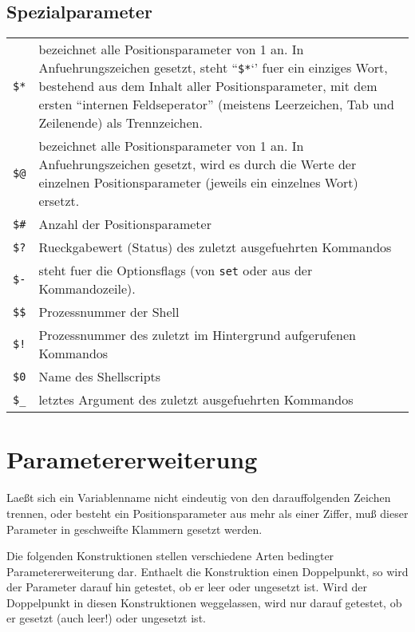 \documentclass[12pt,]{article}
\providecommand{\tightlist}{%
  \setlength{\itemsep}{0pt}\setlength{\parskip}{0pt}}
\begin{document}
\subsection{Spezialparameter}\label{spezialparameter}

\begin{longtable}[c]{@{}ll@{}}
\toprule
\texttt{\$*} & bezeichnet alle Positionsparameter von 1 an. In
Anfuehrungszeichen gesetzt, steht ``\texttt{\$*}`' fuer ein einziges
Wort, bestehend aus dem Inhalt aller Positionsparameter, mit dem ersten
``internen Feldseperator'' (meistens Leerzeichen, Tab und Zeilenende)
als Trennzeichen.\tabularnewline
\texttt{\$@} & bezeichnet alle Positionsparameter von 1 an. In
Anfuehrungszeichen gesetzt, wird es durch die Werte der einzelnen
Positionsparameter (jeweils ein einzelnes Wort) ersetzt.\tabularnewline
\texttt{\$\#} & Anzahl der Positionsparameter\tabularnewline
\texttt{\$?} & Rueckgabewert (Status) des zuletzt ausgefuehrten
Kommandos\tabularnewline
\texttt{\$-} & steht fuer die Optionsflags (von \texttt{set} oder aus
der Kommandozeile).\tabularnewline
\texttt{\$\$} & Prozessnummer der Shell\tabularnewline
\texttt{\$!} & Prozessnummer des zuletzt im Hintergrund aufgerufenen
Kommandos\tabularnewline
\texttt{\$0} & Name des Shellscripts\tabularnewline
\texttt{\$\_} & letztes Argument des zuletzt ausgefuehrten
Kommandos\tabularnewline
\bottomrule
\end{longtable}

\section{Parametererweiterung}\label{parametererweiterung}

\begin{description}
\tightlist
\item[\textbf{\$\{}\emph{Parameter}\textbf{\}}]
Laeßt sich ein Variablenname nicht eindeutig von den darauffolgenden
Zeichen trennen, oder besteht ein Positionsparameter aus mehr als einer
Ziffer, muß dieser Parameter in geschweifte Klammern gesetzt werden.
\end{description}

Die folgenden Konstruktionen stellen verschiedene Arten bedingter
Parametererweiterung dar. Enthaelt die Konstruktion einen Doppelpunkt,
so wird der Parameter darauf hin getestet, ob er leer oder ungesetzt
ist. Wird der Doppelpunkt in diesen Konstruktionen weggelassen, wird nur
darauf getestet, ob er gesetzt (auch leer!) oder ungesetzt ist.
\end{document}
